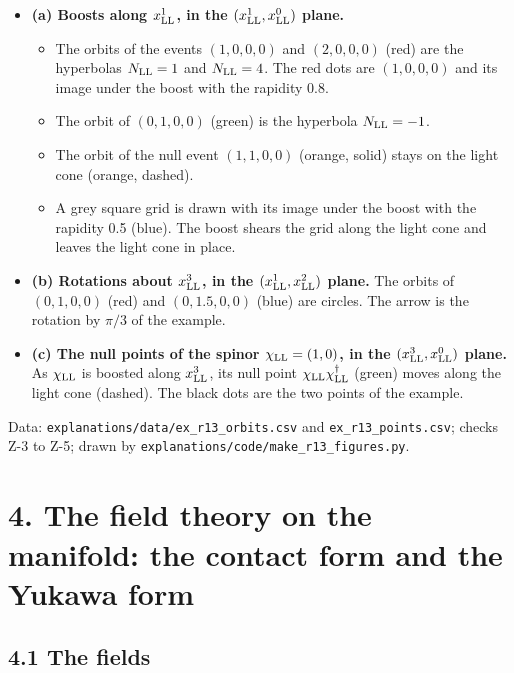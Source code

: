 \documentclass[
  10pt,
]{article}
\providecommand{\tightlist}{%
  \setlength{\itemsep}{0pt}\setlength{\parskip}{0pt}}
\begin{document}
\begin{itemize}
\tightlist
\item
  \textbf{(a) Boosts along \(x^1_{\rm LL}\), in the
  \((x^1_{\rm LL},x^0_{\rm LL})\) plane.}

  \begin{itemize}
  \tightlist
  \item
    The orbits of the events \((1,0,0,0)\) and \((2,0,0,0)\) (red) are
    the hyperbolas \(N_{\rm LL}=1\) and \(N_{\rm LL}=4\). The red dots
    are \((1,0,0,0)\) and its image under the boost with the rapidity
    0.8.
  \item
    The orbit of \((0,1,0,0)\) (green) is the hyperbola
    \(N_{\rm LL}=-1\).
  \item
    The orbit of the null event \((1,1,0,0)\) (orange, solid) stays on
    the light cone (orange, dashed).
  \item
    A grey square grid is drawn with its image under the boost with the
    rapidity 0.5 (blue). The boost shears the grid along the light cone
    and leaves the light cone in place.
  \end{itemize}
\item
  \textbf{(b) Rotations about \(x^3_{\rm LL}\), in the
  \((x^1_{\rm LL},x^2_{\rm LL})\) plane.} The orbits of \((0,1,0,0)\)
  (red) and \((0,1.5,0,0)\) (blue) are circles. The arrow is the
  rotation by \(\pi/3\) of the example.
\item
  \textbf{(c) The null points of the spinor \(\chi_{\rm LL}=(1,0)\), in
  the \((x^3_{\rm LL},x^0_{\rm LL})\) plane.} As \(\chi_{\rm LL}\) is
  boosted along \(x^3_{\rm LL}\), its null point
  \(\chi_{\rm LL}\chi_{\rm LL}^\dagger\) (green) moves along the light
  cone (dashed). The black dots are the two points of the example.
\end{itemize}

Data: \texttt{explanations/data/ex\_r13\_orbits.csv} and
\texttt{ex\_r13\_points.csv}; checks Z-3 to Z-5; drawn by
\texttt{explanations/code/make\_r13\_figures.py}.

\hypertarget{the-field-theory-on-the-manifold-the-contact-form-and-the-yukawa-form}{%
\section{4. The field theory on the manifold: the contact form and the
Yukawa
form}\label{the-field-theory-on-the-manifold-the-contact-form-and-the-yukawa-form}}

\hypertarget{the-fields}{%
\subsection{4.1 The fields}\label{the-fields}}
\end{document}
